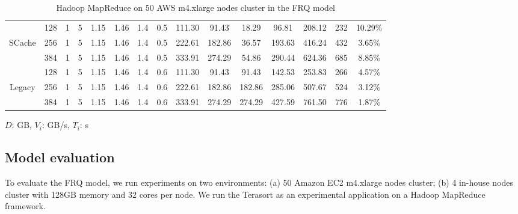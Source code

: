 {\begin{table}
{\begin{tabular}{|c||c|c|c|c|c|c|c||c|c|c|c|c|c|c|}
	\hline
	& 128	& 1 & 5 &	1.15 &	1.46	&	1.4 &	0.5 &	111.30 &	91.43	&	18.29	&	96.81	&	208.12	&	232	&	10.29\%	\\
	SCache
	& 256	& 1 & 5 &	1.15 &	1.46	&	1.4 &	0.5 &	222.61 &	182.86	&	36.57	&	193.63	&	416.24	&	432	&	3.65\%	\\
	& 384	& 1 & 5 &	1.15 &	1.46	&	1.4 &	0.5 &	333.91 &	274.29	&	54.86	&	290.44	&	624.36	&	685 &	8.85\%	\\
	\hline
	& 128	& 1 & 5 &	1.15 &	1.46	&	1.4 &	0.6 &	111.30 &	91.43	&	91.43	&	142.53	&	253.83	&	266 &	4.57\%	\\
	Legacy
	& 256	& 1 & 5 &	1.15 &	1.46	&	1.4 &	0.6 &	222.61 &	182.86	&	182.86	&	285.06	&	507.67	&	524 &	3.12\%	\\
	& 384	& 1 & 5 &	1.15 &	1.46	&	1.4 &	0.6 &	333.91 &	274.29	&	274.29	&	427.59	&	761.50	&	776 &	1.87\%	\\

	\hline
	\end{tabular}
}
\(D\): GB, \(V_{i}\): GB/s, \(T_{i}\): s
\caption{\color{black}Hadoop MapReduce on 50 AWS m4.xlarge nodes cluster in the FRQ model}
\label{table2}
\end{table}

\subsection{Model evaluation}\label{model_evaluation}
To evaluate the FRQ model, we run experiments on two environments: (a) 50 Amazon EC2 m4.xlarge nodes cluster; (b) 4 in-house nodes cluster with 128GB memory and 32 cores per node.
We run the Terasort as an experimental application on a Hadoop MapReduce framework.

}
